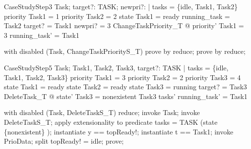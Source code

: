 \documentclass[a4paper, 12pt]{article}
\begin{document}
\begin{theorem}{CaseStudyStep3}
\forall  Task; target?: TASK; newpri?: \nat  | tasks = \{idle, Task1, Task2\} \land  priority Task1 = 1 \land  priority Task2 = 2 \land  state Task1 = ready \land  running\_task = Task2 \land  target? = Task1 \land  newpri? = 3 \land  ChangeTaskPriority\_T @ priority' Task1 = 3 \land  running\_task' = Task1
\end{theorem}

\begin{zproof}[CaseStudyStep3]
with disabled (Task, ChangeTaskPriorityS\_T) prove by reduce;
prove by reduce;
\end{zproof}

\begin{theorem}{CaseStudyStep5}
\forall  Task; Task1, Task2, Task3, target?: TASK | tasks = \{idle, Task1, Task2, Task3\} \land  priority Task1 = 3 \land  priority Task2 = 2 \land  priority Task3 = 4 \land  state Task1 = ready \land  state Task2 = ready \land  state Task3 = running \land  target? = Task3 \land  DeleteTask\_T @ state' Task3 = nonexistent \land  Task3 \notin  tasks' \land  running\_task' = Task1
\end{theorem}

\begin{zproof}[CaseStudyStep5]
with disabled (Task, DeleteTaskS\_T) reduce;
invoke Task;
invoke DeleteTaskS\_T;
apply extensionality to predicate tasks = TASK \setminus  (state \inv  \limg  \{nonexistent\} \rimg );
instantiate y == topReady!;
instantiate t == Task1;
invoke PrioData;
split topReady! = idle;
prove;
\end{zproof}
\end{document}
